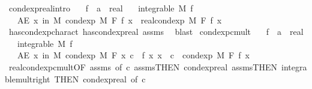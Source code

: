 \begin{isabellebody}
\isanewline
%
\endisadelimproof
\isanewline
{}\isamarkupfalse%
\ cond{\isacharunderscore}{\kern0pt}exp{\isacharunderscore}{\kern0pt}real{\isacharbrackleft}{\kern0pt}intro{\isacharbrackright}{\kern0pt}{\isacharcolon}{\kern0pt}\isanewline
\ \ \ f\ {\isacharcolon}{\kern0pt}{\isacharcolon}{\kern0pt}\ {\isachardoublequoteopen}{\isacharprime}{\kern0pt}a\ {\isasymRightarrow}\ real{\isachardoublequoteclose}\isanewline
\ \ \ {\isachardoublequoteopen}integrable\ M\ f{\isachardoublequoteclose}\isanewline
\ \ \ {\isachardoublequoteopen}AE\ x\ in\ M{\isachardot}{\kern0pt}\ cond{\isacharunderscore}{\kern0pt}exp\ M\ F\ f\ x\ {\isacharequal}{\kern0pt}\ real{\isacharunderscore}{\kern0pt}cond{\isacharunderscore}{\kern0pt}exp\ M\ F\ f\ x{\isachardoublequoteclose}\ \isanewline
%
\isadelimproof
\ \ %
\endisadelimproof
%
\isatagproof
{}\isamarkupfalse%
\ has{\isacharunderscore}{\kern0pt}cond{\isacharunderscore}{\kern0pt}exp{\isacharunderscore}{\kern0pt}charact\ has{\isacharunderscore}{\kern0pt}cond{\isacharunderscore}{\kern0pt}exp{\isacharunderscore}{\kern0pt}real\ assms\ \isamarkupfalse%
\ blast%
\endisatagproof
{\isafoldproof}%
%
\isadelimproof
\isanewline
%
\endisadelimproof
\isanewline
{}\isamarkupfalse%
\ cond{\isacharunderscore}{\kern0pt}exp{\isacharunderscore}{\kern0pt}cmult{\isacharcolon}{\kern0pt}\isanewline
\ \ \ f\ {\isacharcolon}{\kern0pt}{\isacharcolon}{\kern0pt}\ {\isachardoublequoteopen}{\isacharprime}{\kern0pt}a\ {\isasymRightarrow}\ real{\isachardoublequoteclose}\isanewline
\ \ \ {\isachardoublequoteopen}integrable\ M\ f{\isachardoublequoteclose}\isanewline
\ \ \ {\isachardoublequoteopen}AE\ x\ in\ M{\isachardot}{\kern0pt}\ cond{\isacharunderscore}{\kern0pt}exp\ M\ F\ {\isacharparenleft}{\kern0pt}{\isasymlambda}x{\isachardot}{\kern0pt}\ c\ {\isacharasterisk}{\kern0pt}\ f\ x{\isacharparenright}{\kern0pt}\ x\ {\isacharequal}{\kern0pt}\ c\ {\isacharasterisk}{\kern0pt}\ cond{\isacharunderscore}{\kern0pt}exp\ M\ F\ f\ x{\isachardoublequoteclose}\isanewline
%
\isadelimproof
\ \ %
\endisadelimproof
%
\isatagproof
{}\isamarkupfalse%
\ real{\isacharunderscore}{\kern0pt}cond{\isacharunderscore}{\kern0pt}exp{\isacharunderscore}{\kern0pt}cmult{\isacharbrackleft}{\kern0pt}OF\ assms{\isacharparenleft}{\kern0pt}{}{\isacharparenright}{\kern0pt}{\isacharcomma}{\kern0pt}\ of\ c{\isacharbrackright}{\kern0pt}\ assms{\isacharparenleft}{\kern0pt}{}{\isacharparenright}{\kern0pt}{\isacharbrackleft}{\kern0pt}THEN\ cond{\isacharunderscore}{\kern0pt}exp{\isacharunderscore}{\kern0pt}real{\isacharbrackright}{\kern0pt}\ assms{\isacharparenleft}{\kern0pt}{}{\isacharparenright}{\kern0pt}{\isacharbrackleft}{\kern0pt}THEN\ integrable{\isacharunderscore}{\kern0pt}mult{\isacharunderscore}{\kern0pt}right{\isacharcomma}{\kern0pt}\ THEN\ cond{\isacharunderscore}{\kern0pt}exp{\isacharunderscore}{\kern0pt}real{\isacharcomma}{\kern0pt}\ of\ c{\isacharbrackright}{\kern0pt}\ \isamarkupfalse%

\end{isabellebody}
